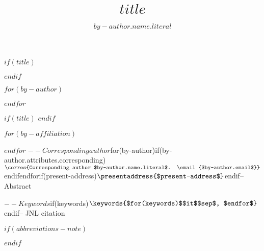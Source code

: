 $if(title)$
\title{$title$}
$endif$

$for(by-author)$
\author[$for(by-author.affiliations)$$it.number$$sep$,$endfor$]{$by-author.name.literal$}
$endfor$

$if(title)$
$endif$

$for(by-affiliation)$
\address[$it.number$]{, ,}

$endfor$
$-- Corresponding author
$for(by-author)$
$if(by-author.attributes.corresponding)$\corres{Corresponding author $by-author.name.literal$. \email{$by-author.email$}}$endif$
$endfor$
$if(present-address)$
\presentaddress{$present-address$}
$endif$


$-- Abstract

$-- Keywords
$if(keywords)$
\keywords{$for(keywords)$$it$$sep$, $endfor$}
$endif$

$-- JNL citation

\maketitle

$if(abbreviations-note)$
\renewcommand\thefootnote{}

\renewcommand\thefootnote{\fnsymbol{footnote}}
\setcounter{footnote}{1}
$endif$